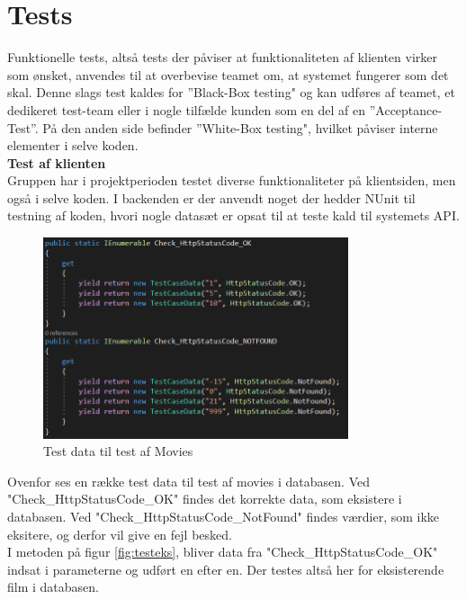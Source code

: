 \section{Tests}\label{sec:tests}
Funktionelle tests, altså tests der påviser at funktionaliteten af klienten virker som ønsket, 
anvendes til at overbevise teamet om, at systemet fungerer som det skal. 
Denne slags test kaldes for ”Black-Box testing" og kan udføres af teamet, 
et dedikeret test-team eller i nogle tilfælde kunden som en del af en ”Acceptance-Test”. 
På den anden side befinder ”White-Box testing", hvilket påviser interne elementer i selve koden. \\

\textbf{Test af klienten} \\
Gruppen har i projektperioden testet diverse funktionaliteter på klientsiden, 
men også i selve koden. I backenden er der anvendt noget der hedder NUnit til testning af koden, 
hvori nogle datasæt er opsat til at teste kald til systemets API.\\

\begin{figure}[H]
    \centering
    \includegraphics[width=0.8\textwidth]{figures/testmoviedata.PNG}
    \caption{Test data til test af Movies}
    \label{fig:testdata}
\end{figure}

Ovenfor ses en række test data til test af movies i databasen. Ved "Check\_HttpStatusCode\_OK" findes det korrekte data,
som eksistere i databasen. Ved "Check\_HttpStatusCode\_NotFound" findes værdier, som ikke eksitere, og derfor vil give
en fejl besked. \\

I metoden på figur \ref{fig:testeks}, bliver data fra "Check\_HttpStatusCode\_OK" indsat i parameterne
og udført en efter en. Der testes altså her for eksisterende film i databasen. 

